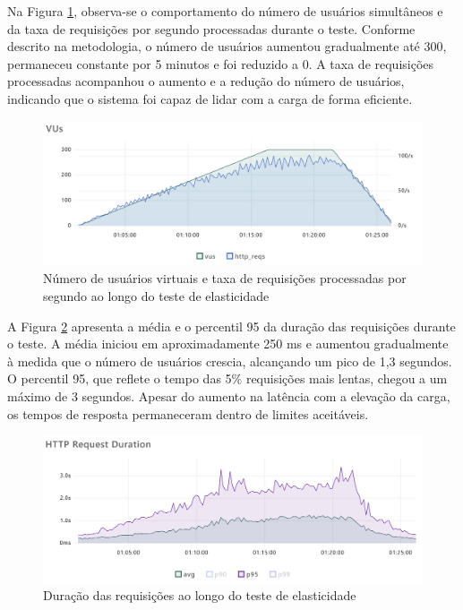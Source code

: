 Na Figura \ref{fig:elasticity-vus-and-reqs}, observa-se o comportamento do número de usuários simultâneos e da taxa de requisições por segundo processadas durante o teste. Conforme descrito na metodologia, o número de usuários aumentou gradualmente até 300, permaneceu constante por 5 minutos e foi reduzido a 0. A taxa de requisições processadas acompanhou o aumento e a redução do número de usuários, indicando que o sistema foi capaz de lidar com a carga de forma eficiente.

\begin{figure}[H]
    \centering
    \includegraphics[width=1\textwidth]{assets/elasticity-test/vus-and-reqs.png}
    \caption{Número de usuários virtuais e taxa de requisições processadas por segundo ao longo do teste de elasticidade}
    \label{fig:elasticity-vus-and-reqs}
\end{figure}

A Figura \ref{fig:elasticity-req-duration} apresenta a média e o percentil 95 da duração das requisições durante o teste. A média iniciou em aproximadamente 250 ms e aumentou gradualmente à medida que o número de usuários crescia, alcançando um pico de 1,3 segundos. O percentil 95, que reflete o tempo das 5\% requisições mais lentas, chegou a um máximo de 3 segundos. Apesar do aumento na latência com a elevação da carga, os tempos de resposta permaneceram dentro de limites aceitáveis.

\begin{figure}[H]
    \centering
    \includegraphics[width=1\textwidth]{assets/elasticity-test/req-duration.png}
    \caption{Duração das requisições ao longo do teste de elasticidade}
    \label{fig:elasticity-req-duration}
\end{figure}

